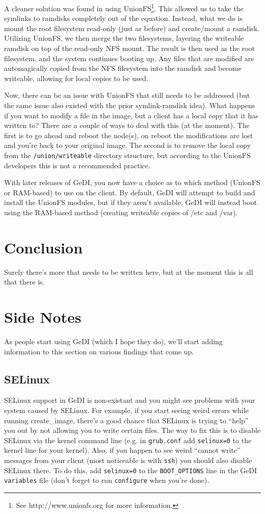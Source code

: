 \documentclass[10pt,a4paper,titlepage]{article}
\begin{document}
A cleaner solution was found in using UnionFS\footnote{See
http://www.unionfs.org for more information.}.  This allowed us to take the
symlinks to ramdisks completely out of the equation.  Instead, what we do is
mount the root filesystem read-only (just as before) and create/mount a ramdisk.
Utilizing UnionFS, we then merge the two filesystems, layering the writeable
ramdisk on top of the read-only NFS mount.  The result is then used as the
root filesystem, and the system continues booting up.  Any files that are
modified are automagically copied from the NFS filesystem into the ramdisk and
become writeable, allowing for local copies to be used.

Now, there can be an issue with UnionFS that still needs to be addressed (but
the same issue also existed with the prior symlink-ramdisk idea).  What happens
if you want to modify a file in the image, but a client has a local copy that
it has written to?  There are a couple of ways to deal with this (at the
moment).  The first is to go ahead and reboot the node(s), on reboot the
modifications are lost and you're back to your original image.  The second is
to remove the local copy from the \verb!/union/writeable! directory structure,
but according to the UnionFS developers this is not a recommended practice.

With later releases of GeDI, you now have a choice as to which method (UnionFS
or RAM-based) to use on the client.  By default, GeDI will attempt to build
and install the UnionFS modules, but if they aren't available, GeDI will instead
boot using the RAM-based method (creating writeable copies of /etc and /var).

\section{Conclusion}
Surely there's more that needs to be written here, but at the moment this is
all that there is.

\section{Side Notes}
As people start using GeDI (which I hope they do), we'll start adding
information to this section on various findings that come up.

\subsection{SELinux}
SELinux support in GeDI is non-existant and you might see problems with your
system caused by SELinux.  For example, if you start seeing weird errors while
running create\_image, there's a good chance that SELinux is trying to ``help''
you out by not allowing you to write certain files.  The way to fix this is to
disable SELinux via the kernel command line (e.g. in \verb!grub.conf! add
\verb!selinux=0! to the kernel line for your kernel).  Also, if you happen to
see weird ``cannot write'' messages from your client (most noticeable is with
\verb!ssh!) you should also disable SELinux there.  To do this, add
\verb!selinux=0! to the \verb!BOOT_OPTIONS! line in the GeDI \verb!variables!
file (don't forget to run \verb!configure! when you're done).
\end{document}
